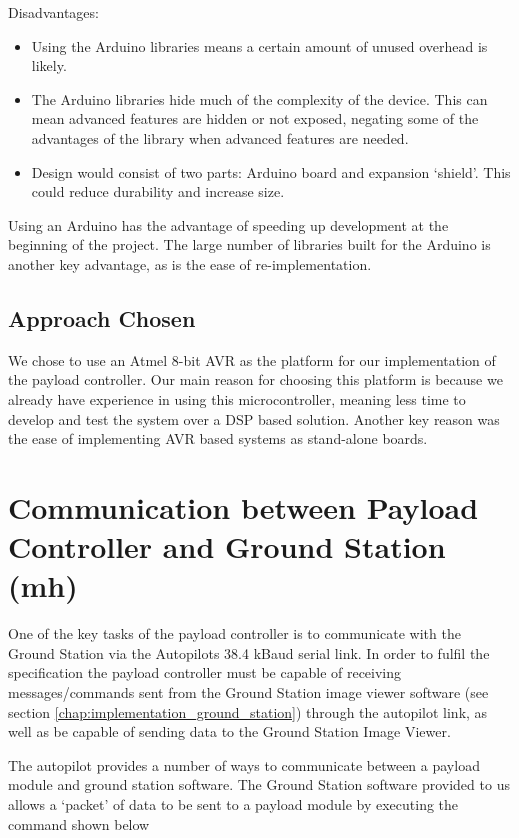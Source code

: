 Disadvantages:
\begin{itemize}
\item Using the Arduino libraries means a certain amount of unused overhead is likely.

\item The Arduino libraries hide much of the complexity of the device. This can mean advanced features are hidden or not exposed, negating some of the advantages of the library when advanced features are needed.

\item Design would consist of two parts: Arduino board and expansion `shield'. This could reduce durability and increase size.
\end{itemize}

Using an Arduino has the advantage of speeding up development at the beginning of the project. The large number of libraries built for the Arduino is another key advantage, as is the ease of re-implementation.

\subsection{Approach Chosen}
We chose to use an Atmel 8-bit AVR as the platform for our implementation of the payload controller. Our main reason for choosing this platform is because we already have experience in using this microcontroller, meaning less time to develop and 
test the system over a DSP based solution. Another key reason was the ease of implementing AVR based systems as 
stand-alone boards.

\section{Communication between Payload Controller and Ground Station (mh)}
One of the key tasks of the payload controller is to communicate with the Ground Station via the Autopilots 38.4 kBaud serial link. In order to fulfil the specification the payload controller must be capable of receiving messages/commands sent from the Ground Station image viewer software (see section \ref{chap:implementation_ground_station}) through the autopilot link, as well as be capable of sending data to the Ground Station Image Viewer.

The autopilot provides a number of ways to communicate between a payload module and ground station software. The Ground Station software provided to us allows a `packet' of data to be sent to a payload module by executing the command shown below

